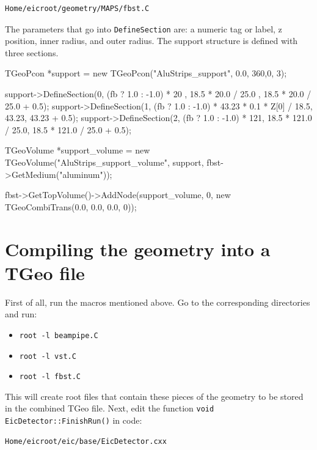 \documentclass[12pt]{article}
\begin{document}
\begin{tcolorbox}
\begin{verbatim}
Home/eicroot/geometry/MAPS/fbst.C
\end{verbatim}  
\end{tcolorbox}

The parameters that go into \verb|DefineSection| are: a numeric tag or label, z position, inner radius, and outer radius.
The support structure is defined with three sections. 

\begin{tcolorbox}
\begin{verbnobox}[\scriptsize]
TGeoPcon *support = new TGeoPcon("AluStrips_support", 0.0, 360,0, 3);

support->DefineSection(0, (fb ? 1.0 : -1.0) * 20 , 18.5 * 20.0 / 25.0 , 18.5 *  20.0 / 25.0 + 0.5);
support->DefineSection(1, (fb ? 1.0 : -1.0) * 43.23 * 0.1 * Z[0] / 18.5, 43.23, 43.23 + 0.5);
support->DefineSection(2, (fb ? 1.0 : -1.0) * 121, 18.5 * 121.0 / 25.0, 18.5 * 121.0 / 25.0 + 0.5);

TGeoVolume *support_volume = new TGeoVolume("AluStrips_support_volume", support, fbst->GetMedium("aluminum"));

fbst->GetTopVolume()->AddNode(support_volume, 0, new TGeoCombiTrans(0.0, 0.0, 0.0, 0));
\end{verbnobox}  
\end{tcolorbox}

\section{Compiling the geometry into a TGeo file}

First of all, run the macros mentioned above. Go to the corresponding directories and run:

\begin{itemize}
\item \verb|root -l beampipe.C|
\item \verb|root -l vst.C|
\item \verb|root -l fbst.C|
\end{itemize}
This will create root files that contain these pieces of the geometry to be stored in the combined TGeo file.
Next, edit the function \verb|void EicDetector::FinishRun()| in code:

\begin{tcolorbox}
\begin{verbatim}
Home/eicroot/eic/base/EicDetector.cxx
\end{verbatim}  
\end{tcolorbox}
\end{document}
